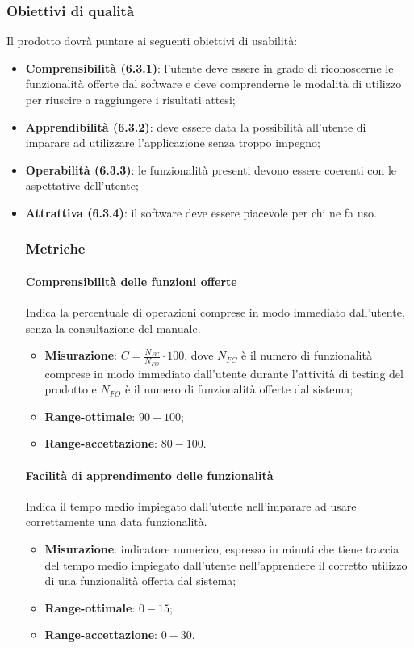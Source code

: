 \subsubsection{Obiettivi di qualità}
Il prodotto dovrà puntare ai seguenti obiettivi di usabilità:
\begin{itemize}
\item \textbf{Comprensibilità (6.3.1)}: l'utente deve essere in grado di riconoscerne le funzionalità offerte dal software e deve comprenderne le modalità di utilizzo per riuscire a raggiungere i risultati attesi;
\item \textbf{Apprendibilità (6.3.2)}: deve essere data la possibilità all'utente di imparare ad utilizzare l'applicazione senza troppo impegno;
\item \textbf{Operabilità (6.3.3)}: le funzionalità presenti devono essere coerenti con le aspettative dell'utente;
\item \textbf{Attrattiva (6.3.4)}: il software deve essere piacevole per chi ne fa uso.
\subsubsection{Metriche}
\paragraph{Comprensibilità delle funzioni offerte}
Indica la percentuale di operazioni comprese in modo immediato dall'utente, senza la consultazione del manuale.
\begin{itemize}
\item \textbf{Misurazione}: $C=\frac{N_{FC}}{N_{FO}} \cdot 100$, dove $N_{FC}$ è il numero di funzionalità comprese in modo immediato dall'utente durante l'attività di testing del prodotto e $N_{FO}$ è il numero di funzionalità offerte dal sistema;
\item \textbf{Range-ottimale}: $90 - 100$;
\item \textbf{Range-accettazione}: $80 - 100$.
\end{itemize}
\paragraph{Facilità di apprendimento delle funzionalità}
Indica il tempo medio impiegato dall'utente nell'imparare ad usare correttamente una data funzionalità.
\begin{itemize}
\item \textbf{Misurazione}: indicatore numerico, espresso in minuti  che tiene traccia del tempo medio impiegato dall'utente nell'apprendere il corretto utilizzo di una funzionalità offerta dal sistema;
\item \textbf{Range-ottimale}: $0 - 15$;
\item \textbf{Range-accettazione}: $0 - 30$.
\end{itemize}

\end{itemize}
